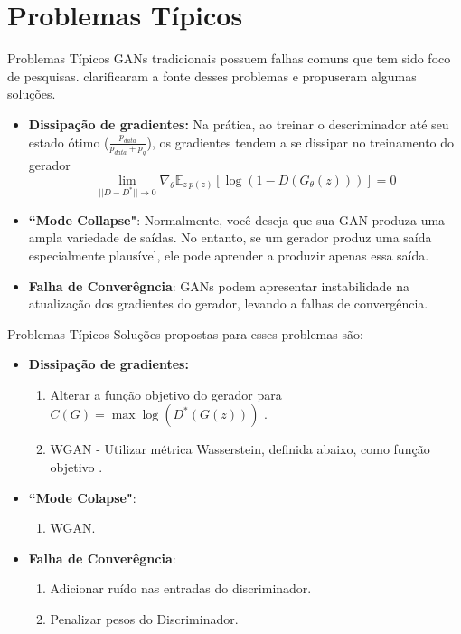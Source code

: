 \documentclass[10pt]{beamer}
\begin{document}
\AtBeginSection{}
\section[Problemas Típicos]{Problemas Típicos}
\begin{frame}[fragile]{Problemas Típicos}
GANs tradicionais possuem falhas comuns que tem sido foco
de pesquisas. \citet{arjovsky2017} clarificaram a fonte desses
problemas e propuseram algumas soluções.
\small
\begin{itemize}
	\item \textbf{Dissipação de gradientes:} Na prática, ao treinar
	o descriminador até seu estado ótimo ($\frac{p_{data}}
	{p_{data} + p_g}$), os gradientes tendem a se dissipar
	no treinamento do gerador
  $$\lim_{||D-D^*||\to0}\nabla_{\theta}\mathbb{E}_{z~p(z)}\left[\log{(1-D(G_{\theta}(z)))}\right] = 0$$

  \item  \textbf{``Mode Collapse"}: Normalmente, você deseja que sua GAN
  produza uma ampla variedade de saídas. No entanto, se um gerador produz
  uma saída especialmente plausível, ele pode aprender a produzir apenas
  essa saída.

  \item \textbf{Falha de Converêgncia}: GANs podem apresentar instabilidade
  na atualização dos gradientes do gerador, levando a falhas de
  convergência.
\end{itemize}

\end{frame}

\begin{frame}[fragile]{Problemas Típicos}
Soluções propostas para esses problemas são:
\small
\begin{itemize}
	\item \textbf{Dissipação de gradientes:}
	\begin{enumerate}
		\item Alterar a função objetivo do gerador para
		$C(G) = \max \log(D^*(G(z)))$ \citep{goodfellow2014}.
		\item WGAN - Utilizar métrica Wasserstein, definida abaixo,
		como função objetivo \citep{wgan2017}.
	\end{enumerate}

  \item  \textbf{``Mode Colapse"}:
	\begin{enumerate}
		\item WGAN.
	\end{enumerate}

  \item \textbf{Falha de Converêgncia}:
	\begin{enumerate}
		\item Adicionar ruído nas entradas do discriminador.
  
  		\item Penalizar pesos do Discriminador.

	\end{enumerate}
\end{itemize}

\end{frame}
\end{document}
